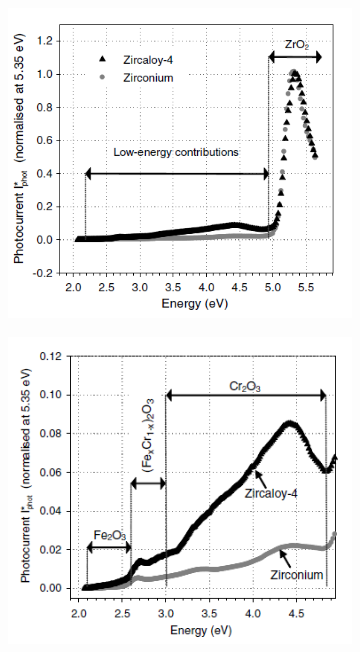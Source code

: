     \renewcommand{\coef}{0.45}
    \begin{figure}[h]
        \centering
        \begin{subfigure}{\coef\textwidth}
            \centering
            \includegraphics[width=\textwidth]{./src/figures/Benaboud2007-Fig4.png}
            \caption{}
            \label{fig_benaboud_minor_oxides_a}
        \end{subfigure}
        \begin{subfigure}{\coef\textwidth}
            \centering
            \includegraphics[width=\textwidth]{./src/figures/Benaboud2007-Fig5.png}
            \caption{}
            \label{fig_benaboud_minor_oxides_b}
        \end{subfigure}
        

\end{figure}

